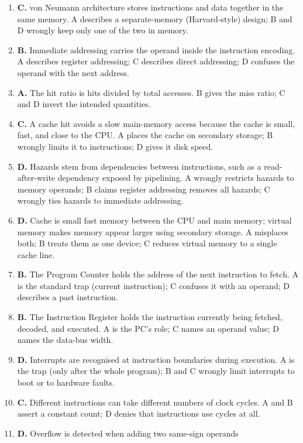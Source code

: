\begin{enumerate}[label=\textbf{Q\arabic*.}, leftmargin=*]
\item \textbf{C.} von Neumann architecture stores instructions and data
  together in the same memory. A describes a separate-memory (Harvard-style)
  design; B and D wrongly keep only one of the two in memory.
\item \textbf{B.} Immediate addressing carries the operand inside the
  instruction encoding. A describes register addressing; C describes direct
  addressing; D confuses the operand with the next address.
\item \textbf{A.} The hit ratio is hits divided by total accesses. B gives the
  miss ratio; C and D invert the intended quantities.
\item \textbf{C.} A cache hit avoids a slow main-memory access because the
  cache is small, fast, and close to the CPU. A places the cache on secondary
  storage; B wrongly limits it to instructions; D gives it disk speed.
\item \textbf{D.} Hazards stem from dependencies between instructions, such as
  a read-after-write dependency exposed by pipelining. A wrongly restricts
  hazards to memory operands; B claims register addressing removes all
  hazards; C wrongly ties hazards to immediate addressing.
\item \textbf{D.} Cache is small fast memory between the CPU and main memory;
  virtual memory makes memory appear larger using secondary storage. A
  misplaces both; B treats them as one device; C reduces virtual memory to a
  single cache line.
\item \textbf{B.} The Program Counter holds the address of the next
  instruction to fetch. A is the standard trap (current instruction); C
  confuses it with an operand; D describes a past instruction.
\item \textbf{B.} The Instruction Register holds the instruction currently
  being fetched, decoded, and executed. A is the PC's role; C names an operand
  value; D names the data-bus width.
\item \textbf{D.} Interrupts are recognised at instruction boundaries during
  execution. A is the trap (only after the whole program); B and C wrongly
  limit interrupts to boot or to hardware faults.
\item \textbf{C.} Different instructions can take different numbers of clock
  cycles. A and B assert a constant count; D denies that instructions use
  cycles at all.
\item \textbf{D.} Overflow is detected when adding two same-sign operands

\end{enumerate}
